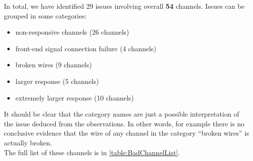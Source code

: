 In total, we have identified 29 issues involving overall \textbf{54} channels.
Issues can be grouped in some categories:
\begin{itemize}
  \item non-responsive channels (26 channels)
  \item front-end signal connection failure (4 channels)
  \item broken wires (9 channels)
  \item larger response (5 channels)
  \item extremely larger response (10 channels)
\end{itemize}
It should be clear that the category names are just a possible interpretation of
the issue deduced from the observations. In other words, for example there is
no conclusive evidence that the wire of any channel in the category ``broken
wires'' is actually broken.
\\
The full list of these channels is in \cref{table:BadChannelList}.
